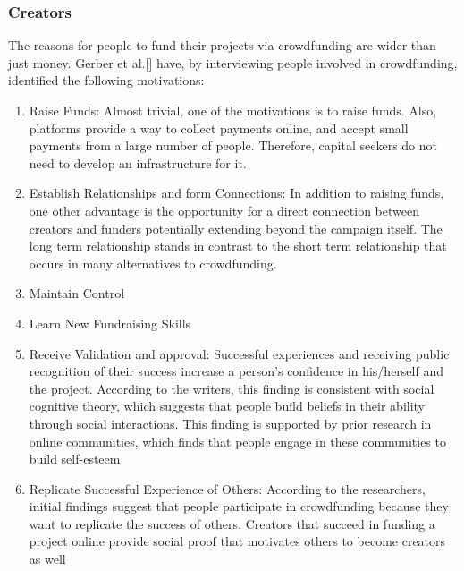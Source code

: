 \subsubsection*{Creators}
The reasons for people to fund their projects via crowdfunding are wider than just money. Gerber et al.[\cite{inproceedings}]
have, by interviewing people involved in crowdfunding, identified the following motivations:
\begin{enumerate}
      \item Raise Funds:
            Almost trivial, one of the motivations is to raise funds. Also, platforms provide a way to
            collect payments online, and accept small payments from a large number of people. Therefore, capital
            seekers do not need to develop an infrastructure for it.

      \item Establish Relationships and form Connections:
            In addition to raising funds, one other advantage is the opportunity for a
            direct connection between creators and funders potentially extending beyond the campaign itself. The
            long term relationship stands in contrast to the short term relationship that occurs in many alternatives
            to crowdfunding.

      \item Maintain Control

      \item Learn New Fundraising Skills

      \item Receive Validation and approval:
            Successful experiences and receiving public recognition of their success increase
            a person’s confidence in his/herself and the project. According to the writers, this finding is consistent
            with social cognitive theory, which suggests that people build beliefs in their ability through social interactions. This finding is supported by prior research in online communities, which finds that people
            engage in these communities to build self-esteem

      \item Replicate Successful Experience of Others:
            According to the researchers, initial findings suggest that
            people participate in crowdfunding because they want to replicate the success of others. Creators that
            succeed in funding a project online provide social proof that motivates others to become creators as
            well


\end{enumerate}
